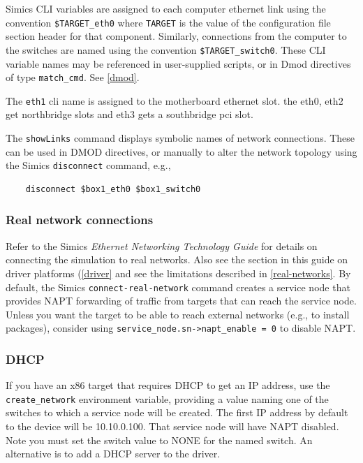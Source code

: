 \documentclass[titlepage]{article}
\begin{document}
Simics CLI variables are assigned to each computer ethernet link using the convention {\tt \$TARGET\_eth0} where {\tt TARGET}
is the value of the configuration file section header for that component.  Similarly, connections from the computer to the switches 
are named using the convention {\tt \$TARGET\_switch0}.  These CLI variable names may be referenced in user-supplied scripts, or in 
Dmod directives of type {\tt match\_cmd}.  See \ref{dmod}.

The {\tt eth1} cli name is assigned to the motherboard ethernet slot. the eth0, eth2 get northbridge slots and eth3 gets a southbridge pci slot.

The {\tt showLinks} command displays symbolic names of network connections.  These can be used in DMOD directives, or manually to alter
the network topology using the Simics {\tt disconnect} command, e.g., 
\begin{verbatim}
    disconnect $box1_eth0 $box1_switch0
\end{verbatim}

\subsubsection{Real network connections}
Refer to the Simics \textit{Ethernet Networking Technology Guide} for details on connecting the simulation to real networks.
Also see the section in this guide on driver platforms (\ref{driver} and see the limitations described in \ref{real-networks}.  
By default, the Simics {\tt connect-real-network} command creates a service
node that provides NAPT forwarding of traffic from targets that can reach the service node.  Unless you want the target to be able to
reach external networks (e.g., to install packages), consider using {\tt service\_node.sn->napt\_enable = 0} to disable NAPT.

\subsubsection{DHCP}
\label{DHCP}
If you have an x86 target that requires DHCP to get an IP address, use the {\tt create\_network} environment variable, providing a value
naming one of the switches to which a service node will be created.  The first IP address by default to the device will be 10.10.0.100.
That service node will have NAPT disabled.  Note you must set the switch value to NONE for the named switch.  An alternative is to add
a DHCP server to the driver.
\end{document}

